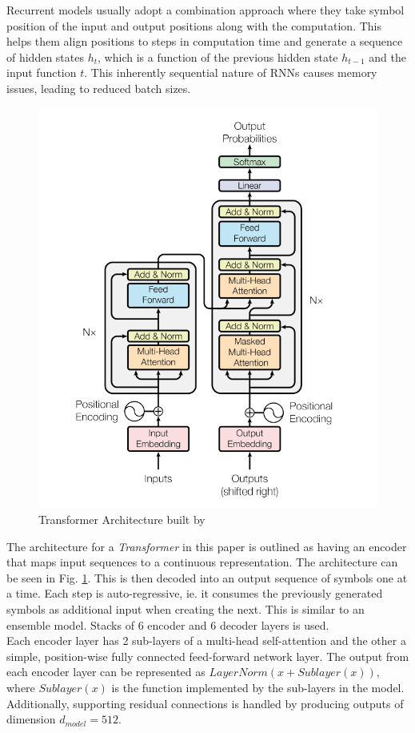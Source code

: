 \documentclass[12pt]{report}
\begin{document}
	        Recurrent models usually adopt a combination approach where they take symbol position of the input and output positions along with the computation. This helps them align positions to steps in computation time and generate a sequence of hidden states $ h_{t} $, which is a function of the previous hidden state $ h_{t-1}$ and the input function $ t $.  This inherently sequential nature of RNNs causes memory issues, leading to reduced batch sizes. \\
			\begin{figure}[h!]
				\centering
				\includegraphics[scale=0.4]{../images/transformer.png}
				\caption{Transformer Architecture built by \citep{atayl}}\label{transformerArchitecture}
			\end{figure}
			The architecture for a \textit{Transformer} in this paper is outlined as having an encoder that maps input sequences to a continuous representation. The architecture can be seen in Fig. \ref{transformerArchitecture}. This is then decoded into an output sequence of symbols one at a time. Each step is auto-regressive, ie. it consumes the previously generated symbols as additional input when creating the next. This is similar to an ensemble model. Stacks of 6 encoder and 6 decoder layers is used.\\
			Each encoder layer has 2 sub-layers of a multi-head self-attention and the other a simple, position-wise fully connected feed-forward network layer. The output from each encoder layer can be represented as $  LayerNorm(x + Sublayer(x)) $, where $ Sublayer(x) $ is the function implemented by the sub-layers in the model. Additionally, supporting residual connections is handled by producing outputs of dimension $ d_{model}=512 $.
\end{document}
